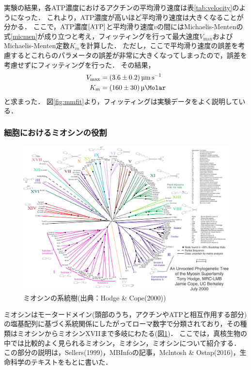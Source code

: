 \documentclass[a4paper,11pt, titlepage]{jsarticle}
\begin{document}
実験の結果，各ATP濃度におけるアクチンの平均滑り速度は表\ref{tab:velocity}のようになった．
これより，ATP濃度が高いほど平均滑り速度は大きくなることが分かる．
ここで，ATP濃度$[\ce{ATP}]$と平均滑り速度$v$の間にはMichaelis-Mentenの式\eqref{micmen}が成り立つと考え，フィッティングを行って最大速度$V_{\mathrm{max}}$およびMichaelis-Menten定数$K_m$を計算した．
ただし，ここで平均滑り速度の誤差を考慮するとこれらのパラメータの誤差が非常に大きくなってしまったので，誤差を考慮せずにフィッティングを行った．
その結果，
\begin{align}
    V_{\mathrm{max}} &= \SI[separate-uncertainty]{3.6 \pm 0.2}{\um\per\second} \\
    K_m &= \SI[separate-uncertainty]{160 \pm 30}{\micro\Molar}
\end{align}
と求まった．
図\ref{fig:mmfit}より，フィッティングは実験データをよく説明している．

\subsubsection{細胞におけるミオシンの役割}

\begin{figure}[htbp]
    \centering
    \includegraphics[width=13cm]{MyosinUnrootedTree.jpg}
    \caption{ミオシンの系統樹(出典：Hodge \& Cope(2000)\cite{myosin_tree})}
    \label{fig:myosin_tree}
\end{figure}

ミオシンはモータードメイン(頭部のうち，アクチンやATPと相互作用する部分)の塩基配列に基づく系統関係にしたがってローマ数字で分類されており，その種類はミオシンからミオシンXVIIまで多岐にわたる(図\ref{fig:myosin_tree})．
ここでは，真核生物の中では比較的よく見られる\cite{myosin_paper}ミオシン，ミオシン，ミオシンについて紹介する．
この部分の説明は，Sellers(1999)\cite{myosin_paper}，MBInfoの記事\cite{what_is_myosin}，Mclntosh \& Ostap(2016)\cite{myosin_1}，生命科学のテキスト\cite{life_science}をもとに書いた．
\end{document}
